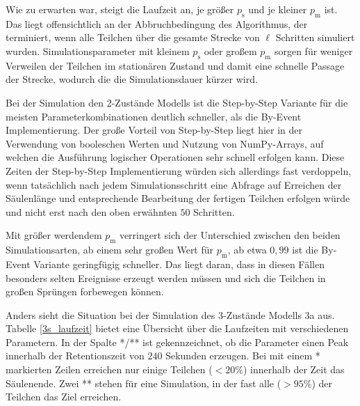 Wie zu erwarten war, steigt die Laufzeit an, je größer $p_\text{s}$ und je kleiner $p_\text{m}$ ist. Das liegt offensichtlich an der Abbruchbedingung des Algorithmus, der terminiert, wenn alle Teilchen über die gesamte Strecke von $\ell$ Schritten simuliert wurden. Simulationsparameter mit kleinem $p_\text{s}$ oder großem $p_\text{m}$ sorgen für weniger Verweilen der Teilchen im stationären Zustand und damit eine schnelle Passage der Strecke, wodurch die die Simulationsdauer kürzer wird. 

Bei der Simulation den 2-Zustände Modells ist die Step-by-Step Variante für die meisten Parameterkombinationen deutlich schneller, als die By-Event Implementierung. Der große Vorteil von Step-by-Step liegt hier in der Verwendung von booleschen Werten und Nutzung von NumPy-Arrays, auf welchen die Ausführung logischer Operationen sehr schnell erfolgen kann. Diese Zeiten der Step-by-Step Implementierung würden sich allerdings fast verdoppeln, wenn tatsächlich nach jedem Simulationsschritt eine Abfrage auf Erreichen der Säulenlänge und entsprechende Bearbeitung der fertigen Teilchen erfolgen würde und nicht erst nach den oben erwähnten $50$ Schritten.

Mit größer werdendem $p_\text{m}$ verringert sich der Unterschied zwischen den beiden Simulationsarten, ab einem sehr großen Wert für $p_{\text{m}}$, ab etwa $0,99$ ist die By-Event Variante geringfügig schneller. Das liegt daran, dass in diesen Fällen besonders selten Ereignisse erzeugt werden müssen und sich die Teilchen in großen Sprüngen forbewegen können. 

Anders sieht die Situation bei der Simulation des 3-Zustände Modells 3a aus. Tabelle \ref{3s_laufzeit} bietet eine Übersicht über die Laufzeiten mit verschiedenen Parametern.
In der Spalte */** ist gekennzeichnet, ob die Parameter einen Peak innerhalb der Retentionszeit von $240$ Sekunden erzeugen. Bei mit einem * markierten Zeilen erreichen nur einige Teilchen ($<20\%$) innerhalb der Zeit das Säulenende. Zwei ** stehen für eine Simulation, in der fast alle ($> 95\%$) der Teilchen das Ziel erreichen.

